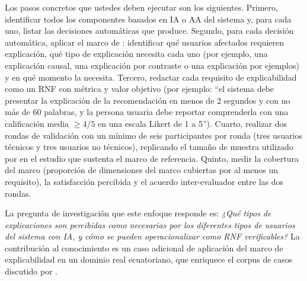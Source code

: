 \documentclass[11pt,a4paper]{article}
\begin{document}
Los pasos concretos que ustedes deben ejecutar son los siguientes.
Primero, identificar todos los componentes basados en IA o AA del sistema y, para cada uno, listar las decisiones automáticas que produce.
Segundo, para cada decisión automática, aplicar el marco de \cite{chazette2020nfr}: identificar qué usuarios afectados requieren explicación, qué tipo de explicación necesita cada uno (por ejemplo, una explicación causal, una explicación por contraste o una explicación por ejemplos) y en qué momento la necesita.
Tercero, redactar cada requisito de explicabilidad como un RNF con métrica y valor objetivo (por ejemplo: ``el sistema debe presentar la explicación de la recomendación en menos de 2 segundos y con no más de 60 palabras, y la persona usuaria debe reportar comprenderla con una calificación media $\geq 4/5$ en una escala Likert de 1 a 5'').
Cuarto, realizar dos rondas de validación con un mínimo de seis participantes por ronda (tres usuarios técnicos y tres usuarios no técnicos), replicando el tamaño de muestra utilizado por \cite{chazette2022explainable} en el estudio que sustenta el marco de referencia.
Quinto, medir la cobertura del marco (proporción de dimensiones del marco cubiertas por al menos un requisito), la satisfacción percibida y el acuerdo inter-evaluador entre las dos rondas.

La pregunta de investigación que este enfoque responde es: \emph{¿Qué tipos de explicaciones son percibidas como necesarias por los diferentes tipos de usuarios del sistema con IA, y cómo se pueden operacionalizar como RNF verificables?}
La contribución al conocimiento es un caso adicional de aplicación del marco de explicabilidad en un dominio real ecuatoriano, que enriquece el corpus de casos discutido por \cite{chazette2022explainable}.
\end{document}
